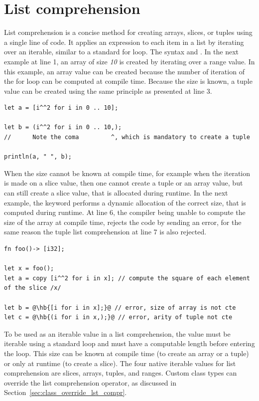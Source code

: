 \section{List comprehension}%
\label{sec:compr:list_compr}

List comprehension is a concise method for creating arrays, slices, or tuples
using a single line of code. It applies an expression to each item in a list by
iterating over an iterable, similar to a standard for loop. The syntax  and . In the next
example at line 1, an array of size \textit{10} is created by iterating over a
range value. In this example, an array value can be created because the number
of iteration of the for loop can be computed at compile time. Because the size
is known, a tuple value can be created using the same principle as presented at
line 3.

\begin{lstlisting}[style=coloredverbatim]
let a = [i^^2 for i in 0 .. 10];

let b = (i^^2 for i in 0 .. 10,);
//      Note the coma         ^, which is mandatory to create a tuple

println(a, " ", b);
\end{lstlisting}

When the size cannot be known at compile time, for example when the iteration is
made on a slice value, then one cannot create a tuple or an array value, but can
still create a slice value, that is allocated during runtime. In the next
example, the keyword  performs a dynamic allocation of the correct
size, that is computed during runtime. At line 6, the compiler being unable to
compute the size of the array at compile time, rejects the code by sending an
error, for the same reason the tuple list comprehension at line 7 is also
rejected.

\begin{lstlisting}[style=coloredverbatimError, escapechar=@]
fn foo()-> [i32];

let x = foo();
let a = copy [i^^2 for i in x]; // compute the square of each element of the slice /x/

let b = @\hb{[i for i in x];}@ // error, size of array is not cte
let c = @\hb{(i for i in x,);}@ // error, arity of tuple not cte
\end{lstlisting}

To be used as an iterable value in a list comprehension, the value must be
iterable using a standard  loop and must have a computable length
before entering the loop. This size can be known at compile time (to create an
array or a tuple) or only at runtime (to create a slice). The four native
iterable values for list comprehension are slices, arrays, tuples, and ranges.
Custom class types can override the list comprehension operator, as discussed in
Section~\ref{sec:class_override_lst_compr}.

